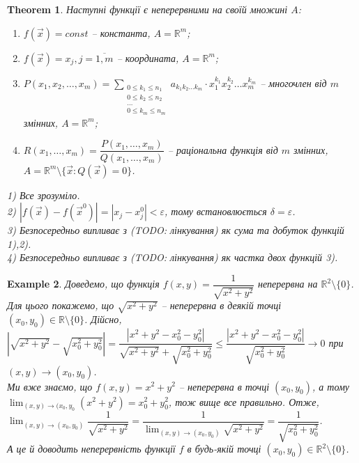 \documentclass[a4paper, 10pt]{article}
\def\huge{\displaystyle}
\theoremstyle{theoremdd}
\newtheorem{theorem}{Theorem}[subsection]
\theoremstyle{theoremdd}
\theoremstyle{theoremdd}
\theoremstyle{theoremdd}
\theoremstyle{theoremdd}
\newtheorem{example}[theorem]{Example}
\theoremstyle{theoremdd}
\theoremstyle{theoremdd}
\theoremstyle{theoremdd}
\theoremstyle{theoremdd}
\begin{document}
\begin{theorem}
Наступні функції є неперервними на своїй множині $A$:
\begin{enumerate}[nosep,wide=0pt,label={\arabic*)}]
\item $f(\vec{x}) = const$ -- константа, $A=\mathbb{R}^m$;
\item $f(\vec{x}) = x_j, j = \overline{1,m}$ -- координата, $A=\mathbb{R}^m$;
\item $P(x_1,x_2,\dots,x_m) = \huge\sum_{\substack{0 \leq k_1 \leq n_1 \\ 0 \leq k_2 \leq n_2 \\ \dots \\ 0 \leq k_m \leq n_m}} a_{k_1 k_2 \dots k_m} \cdot x_1^{k_1} x_2^{k_2} \dots x_m^{k_m}$ -- многочлен від $m$ змінних, $A=\mathbb{R}^m$;\\
\item $R(x_1,\dots,x_m) = \dfrac{P(x_1,\dots,x_m)}{Q(x_1,\dots,x_m)}$ -- раціональна функція від $m$ змінних, $A = \mathbb{R}^m \setminus \{\vec{x}: Q(\vec{x}) = 0 \}$.
\end{enumerate}
\end{theorem}

\textit{
1) Все зрозуміло.
\bigskip \\
2) $|f(\vec{x}) - f(\vec{x}^0)| = |x_j - x_j^0| < \varepsilon$, тому встановлюється $\delta = \varepsilon$.
\bigskip \\
3) Безпосередньо випливає з (TODO: лінкування) як сума та добуток функцій 1),2).
\bigskip \\
4) Безпосередньо випливає з (TODO: лінкування) як частка двох функцій 3).
}

\begin{example}
Доведемо, що функція $f(x,y) = \dfrac{1}{\sqrt{x^2+y^2}}$ неперервна на $\mathbb{R}^2 \setminus \{0\}$.\\
Для цього покажемо, що $\sqrt{x^2+y^2}$ -- неперервна в деякій точці $(x_0,y_0) \in \mathbb{R} \setminus \{0\}$. Дійсно,\\
$|\sqrt{x^2+y^2} - \sqrt{x_0^2+y_0^2}| = \dfrac{|x^2+y^2-x_0^2-y_0^2|}{\sqrt{x^2+y^2} + \sqrt{x_0^2+y_0^2}} \leq \dfrac{|x^2+y^2-x_0^2-y_0^2|}{\sqrt{x_0^2+y_0^2}} \to 0$ при $(x,y) \to (x_0,y_0)$.\\
Ми вже знаємо, що $f(x,y) = x^2+y^2$ -- неперервна в точці $(x_0,y_0)$, а тому $\displaystyle\lim_{(x,y) \to (x_0,y_0} (x^2+y^2) = x_0^2 + y_0^2$, тож вище все правильно. Отже, $\displaystyle\lim_{(x,y) \to (x_0,y_0)} \dfrac{1}{\sqrt{x^2+y^2}} = \dfrac{1}{\displaystyle\lim_{(x,y) \to (x_0,y_0)} \sqrt{x^2+y^2}} = \dfrac{1}{\sqrt{x_0^2+y_0^2}}$.\\
А це й доводить неперервність функції $f$ в будь-якій точці $(x_0,y_0) \in \mathbb{R}^2 \setminus \{0\}$. 
\end{example}
\end{document}
